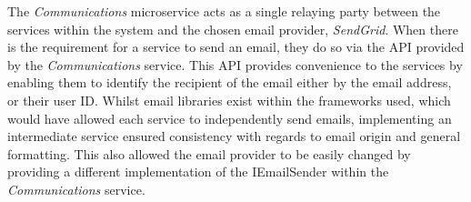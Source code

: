 The \textit{Communications} microservice acts as a single relaying party between the services within the system and the chosen email provider, \textit{SendGrid}. When there is the requirement for a service to send an email, they do so via the API provided by the \textit{Communications} service. This API provides convenience to the services by enabling them to identify the recipient of the email either by the email address, or their user ID. Whilst email libraries exist within the frameworks used, which would have allowed each service to independently send emails, implementing an intermediate service ensured consistency with regards to email origin and general formatting. This also allowed the email provider to be easily changed by providing a different implementation of the IEmailSender within the \textit{Communications} service.
